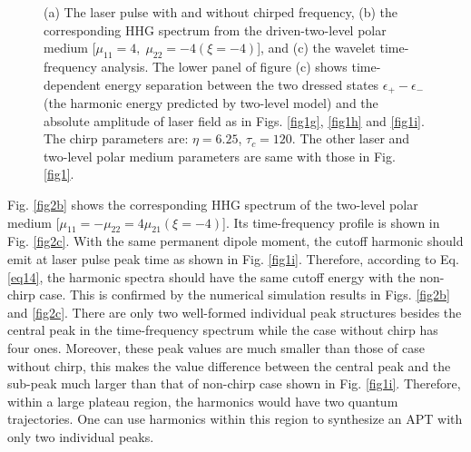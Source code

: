 \documentclass[10pt,letterpaper]{article}
\begin{document}
\begin{figure}[!htbp]
	\centering
	\caption{(a) The laser pulse with and without chirped frequency, (b) the corresponding HHG spectrum from the driven-two-level polar medium [$\mu_{11}=4,\;\mu_{22}=-4(\xi=-4)$], and (c) the wavelet time-frequency analysis. The lower panel of figure (c) shows time-dependent energy separation between the two dressed states $\epsilon_{+}-\epsilon_{-}$ (the harmonic energy predicted by two-level model) and the absolute amplitude of laser field as in Figs. \ref{fig1g}, \ref{fig1h} and \ref{fig1i}. The chirp parameters are: $\eta=6.25$, $\tau_c=120$. The other laser and two-level polar medium parameters are same with those in Fig. \ref{fig1}.}
	\label{fig2}
\end{figure}

Fig. \ref{fig2b} shows the corresponding HHG spectrum of the two-level polar medium [$\mu_{11}=-\mu_{22}=4\mu_{21}(\xi=-4)$]. Its time-frequency profile is shown in Fig. \ref{fig2c}. With the same permanent dipole moment, the cutoff harmonic should emit at laser pulse peak time as shown in Fig. \ref{fig1i}. Therefore, according to Eq. \ref{eq14}, the harmonic spectra should have the same cutoff energy with the non-chirp case. This is confirmed by the numerical simulation results in Figs. \ref{fig2b} and \ref{fig2c}. There are only two well-formed individual peak structures besides the central peak in the time-frequency spectrum while the case without chirp has four ones. Moreover, these peak values are much smaller than those of case without chirp, this makes the value difference between the central peak and the sub-peak much larger than that of non-chirp case shown in Fig. \ref{fig1i}. Therefore, within a large plateau region, the harmonics would have two quantum trajectories. One can use harmonics within this region to synthesize an APT with only two individual peaks.  
\end{document}
